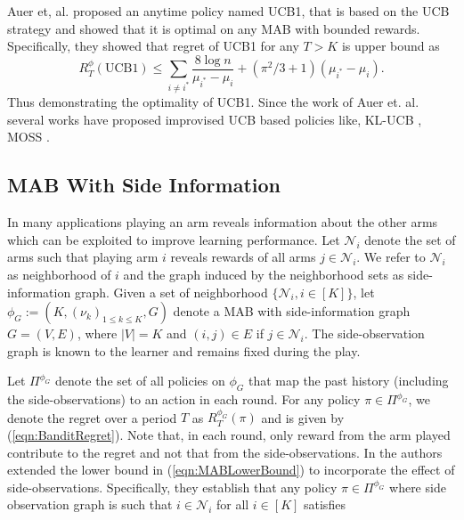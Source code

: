 \documentclass{article}
\begin{document}
Auer et, al. \cite{ML02_FiniteTimeAnalysis_AuerBianchiFischer} proposed an anytime policy named UCB1, that is based on the UCB strategy and showed that it is optimal on any MAB with bounded rewards. Specifically, they showed that regret of UCB1 for any $T>K$ is upper bound as 
\begin{equation}
\label{eqn:UCB1UpperBound}
R^\phi_T(\mbox{UCB1})\leq \sum_{i\neq i^*} \frac{8\log n}{\mu_{i^*}-\mu_i} + (\pi^2/3 + 1)(\mu_{i^*}-\mu_i).
\end{equation}
Thus demonstrating the optimality of UCB1. Since the work of Auer et. al. several works have proposed improvised UCB based policies like, KL-UCB \cite{COLT11_TheKL-UCBAlgorithm_GarivierCappe}, MOSS \cite{JMLR2010_RegretBoundsAndMinimax_AudibertBubeck}.


\subsection{MAB With Side Information}
In many applications playing an arm reveals information about the other arms which can be exploited to improve learning performance. Let $\mathcal{N}_i$  denote the set of arms such that playing arm $i$ reveals rewards of all arms $j \in \mathcal{N}_i$. We refer to $\mathcal{N}_i$ as neighborhood of $i$ and the graph induced by the neighborhood sets as side-information graph. Given a set of neighborhood $\{\mathcal{N}_i, i\in [K]\}$, let $\phi_G:=(K, (\nu_k)_{1\leq k\leq K}, G)$ denote a MAB with side-information graph $G=(V,E)$, where $|V|=K$ and $(i,j)\in E$ if $j \in \mathcal{N}_i$. The side-observation graph is known to the learner and remains fixed during the play. 

Let $\Pi^{\phi_G}$ denote the set of all policies on $\phi_G$ that map the past history (including the side-observations) to an action in each round. For any policy $\pi  \in \Pi^{\phi_G}$, we denote the regret over a period $T$ as $R^{\phi_G}_T(\pi)$ and is given by (\ref{eqn:BanditRegret}). Note that, in each round, 
only reward from the arm played contribute to the regret and not that from the side-observations. In \cite{Sigmetrics15_StochasticBanditsWithSideObservations_BuccapatnamEriyilmazShroff} the authors extended the lower bound in (\ref{eqn:MABLowerBound}) to incorporate the effect of side-observations. Specifically, they establish that any policy $\pi \in \Pi^{\phi_G} 
$ where side observation graph is such that $i \in \mathcal{N}_i$ for all $i\in [K]$ satisfies
 \cite{Sigmetrics15_StochasticBanditsWithSideObservations_BuccapatnamEriyilmazShroff}
\end{document}
